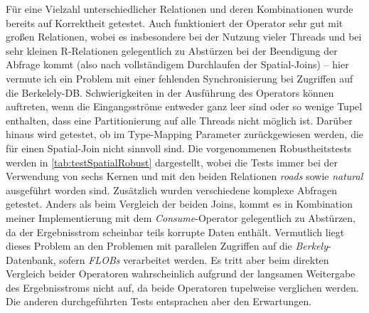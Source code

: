 \documentclass[a4paper,12pt,twoside]{article}
\newcommand{\Fb}[1]{\textit{#1}} %
\begin{document}
Für eine Vielzahl unterschiedlicher Relationen und deren Kombinationen wurde bereits auf Korrektheit getestet. Auch funktioniert der Operator sehr gut mit großen Relationen, wobei es insbesondere bei der Nutzung vieler Threads und bei sehr kleinen R-Relationen gelegentlich zu Abstürzen bei der Beendigung der Abfrage kommt (also nach vollständigem Durchlaufen der Spatial-Joins) -- hier vermute ich ein Problem mit einer fehlenden Synchronisierung bei Zugriffen auf die Berkelely-DB. Schwierigkeiten in der Ausführung des Operators können auftreten, wenn die Eingangsströme entweder ganz leer sind oder so wenige Tupel enthalten, dass eine Partitionierung auf alle Threads nicht möglich ist. Darüber hinaus wird getestet, ob im Type-Mapping Parameter zurückgewiesen werden, die für einen Spatial-Join nicht sinnvoll sind. Die vorgenommenen Robustheitstests werden in \autoref{tab:testSpatialRobust} dargestellt, wobei die Tests immer bei der Verwendung von sechs Kernen und mit den beiden Relationen \Fb{roads} sowie \Fb{natural} ausgeführt worden sind. Zusätzlich wurden verschiedene komplexe Abfragen getestet. Anders als beim Vergleich der beiden Joins, kommt es in Kombination meiner Implementierung mit dem \Fb{Consume}-Operator gelegentlich zu Abstürzen, da der Ergebnisstrom scheinbar teils korrupte Daten enthält. Vermutlich liegt dieses Problem an den Problemen mit parallelen Zugriffen auf die \Fb{Berkely}-Datenbank, sofern \Fb{FLOBs} verarbeitet werden. Es tritt aber beim direkten Vergleich beider Operatoren wahrscheinlich aufgrund der langsamen Weitergabe des Ergebnisstroms nicht auf, da beide Operatoren tupelweise verglichen werden. Die anderen durchgeführten Tests entsprachen aber den Erwartungen.
\end{document}
